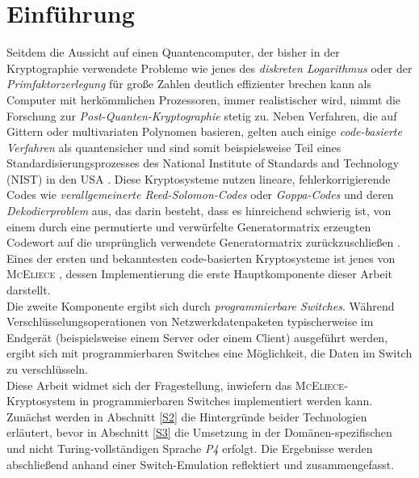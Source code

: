 \documentclass[utf8, biblatex]{lni}
\begin{document}
\section{Einführung}
Seitdem die Aussicht auf einen Quantencomputer, der bisher in der Kryptographie verwendete Probleme wie jenes des \textit{diskreten Logarithmus} oder der \textit{Primfaktorzerlegung} für große Zahlen deutlich effizienter brechen kann als Computer mit herkömmlichen Prozessoren, immer realistischer wird, nimmt die Forschung zur \textit{Post-Quanten-Kryptographie} stetig zu. Neben Verfahren, die auf Gittern oder multivariaten Polynomen basieren, gelten auch einige \textit{code-basierte Verfahren} als quantensicher und sind somit beispielsweise Teil eines Standardisierungsprozesses des National Institute of Standards and Technology (NIST) in den USA \cite{NISTPQC3}. Diese Kryptosysteme nutzen lineare, fehlerkorrigierende Codes wie \textit{verallgemeinerte Reed-Solomon-Codes} oder \textit{Goppa-Codes} und deren \textit{Dekodierproblem} aus, das darin besteht, dass es hinreichend schwierig ist, von einem durch eine permutierte und verwürfelte Generatormatrix erzeugten Codewort auf die ursprünglich verwendete Generatormatrix zurückzuschließen \cite{Berlekamp1978}. Eines der ersten und bekanntesten code-basierten Kryptosysteme ist jenes von \textsc{McEliece} \cite{McEliece1978}, dessen Implementierung die erste Hauptkomponente dieser Arbeit darstellt.\\
Die zweite Komponente ergibt sich durch \textit{programmierbare Switches}. Während Verschlüsselungsoperationen von Netzwerkdatenpaketen typischerweise im Endgerät (beispielsweise einem Server oder einem Client) ausgeführt werden, ergibt sich mit programmierbaren Switches eine Möglichkeit, die Daten im Switch zu verschlüsseln. \\Diese Arbeit widmet sich der Fragestellung, inwiefern das \textsc{McEliece}-Kryptosystem in programmierbaren Switches implementiert werden kann. Zunächst werden in Abschnitt \ref{S2} die Hintergründe beider Technologien erläutert, bevor in Abschnitt \ref{S3} die Umsetzung in der Domänen-spezifischen und nicht Turing-vollständigen Sprache \textit{P4} \cite{P4} erfolgt. Die Ergebnisse werden abschließend anhand einer Switch-Emulation reflektiert und zusammengefasst.
\end{document}
